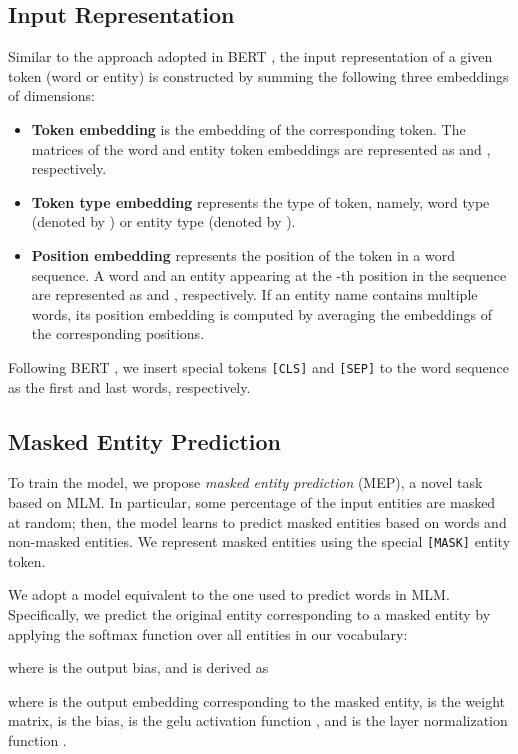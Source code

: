 \documentclass[11pt,a4paper]{article}
\begin{document}
\subsection{Input Representation}
Similar to the approach adopted in BERT \cite{devlin2018bert}, the input representation of a given token (word or entity) is constructed by summing the following three embeddings of  dimensions:
\begin{itemize}[leftmargin=10pt,topsep=5pt,itemsep=0pt]
  \item \textbf{Token embedding} is the embedding of the corresponding token.
        The matrices of the word and entity token embeddings are represented as  and , respectively.
  \item \textbf{Token type embedding} represents the type of token, namely, word type (denoted by ) or entity type (denoted by ).
  \item \textbf{Position embedding} represents the position of the token in a word sequence.
        A word and an entity appearing at the -th position in the sequence are represented as  and , respectively.
        If an entity name contains multiple words, its position embedding is computed by averaging the embeddings of the corresponding positions.
\end{itemize}

Following BERT \cite{devlin2018bert}, we insert special tokens \texttt{[CLS]} and \texttt{[SEP]} to the word sequence as the first and last words, respectively.

\subsection{Masked Entity Prediction}
\label{subsec:mep}
To train the model, we propose \textit{masked entity prediction} (MEP), a novel task based on MLM.
In particular, some percentage of the input entities are masked at random; then, the model learns to predict masked entities based on words and non-masked entities.
We represent masked entities using the special \texttt{[MASK]} entity token.

We adopt a model equivalent to the one used to predict words in MLM.
Specifically, we predict the original entity corresponding to a masked entity by applying the softmax function over all entities in our vocabulary:

where  is the output bias, and  is derived as

where  is the output embedding corresponding to the masked entity,  is the weight matrix,  is the bias,  is the gelu activation function \cite{hendrycks2016gaussian}, and  is the layer normalization function \cite{lei2016layer}.
\end{document}
